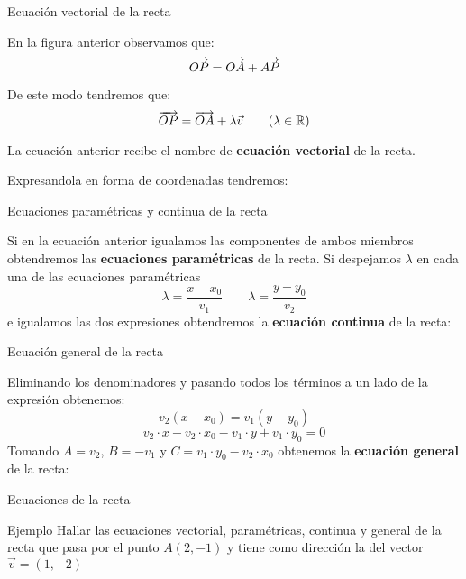 \documentclass[8pt]{beamer}
\begin{document}
\begin{frame}{Ecuación vectorial de la recta}

En la figura anterior observamos que:
\[ \overrightarrow{OP} =  \overrightarrow{OA} +  \overrightarrow{AP} \]

De este modo tendremos que:
\[ \overrightarrow{OP}=\overrightarrow{OA}+\lambda \vec{v} \qquad (\lambda \in \mathbb{R})\]

La ecuación anterior recibe el nombre de \textbf{ecuación vectorial} de la recta.

\pause
Expresandola en forma de coordenadas tendremos:

\end{frame}

\begin{frame}[t]{Ecuaciones paramétricas y continua de la recta}

Si en la ecuación anterior igualamos las componentes de ambos miembros obtendremos las \textbf{ecuaciones paramétricas} de la recta.
\pause
 Si despejamos $\lambda$ en cada una de las ecuaciones paramétricas 
 \[ \lambda= \dfrac{x-x_0}{v_1} \qquad \lambda= \dfrac{y-y_0}{v_2} \]
 e igualamos las dos expresiones obtendremos la \textbf{ecuación continua} de la recta:
\end{frame}

\begin{frame}[t]{Ecuación general de la recta}

Eliminando los denominadores y pasando todos los términos a un lado de la expresión obtenemos:
\[ v_2(x-x_0) = v_1(y-y_0) \] 
\[ v_2 \cdot x- v_2 \cdot x_0 - v_1\cdot y+ v_1 \cdot y_0 =0 \] 
Tomando $A=v_2$, $B=-v_1$ y $C=v_1 \cdot y_0 - v_2 \cdot x_0$ obtenemos la \textbf{ecuación general } de la recta:
\end{frame}
\begin{frame}[t]{Ecuaciones de la recta}
\begin{exampleblock}{Ejemplo}
Hallar las ecuaciones vectorial, paramétricas, continua y general de la recta que pasa por el punto $A(2,-1)$ y tiene como dirección la del vector $\vec{v}=(1,-2)$
\end{exampleblock}
\end{frame}
\end{document}
